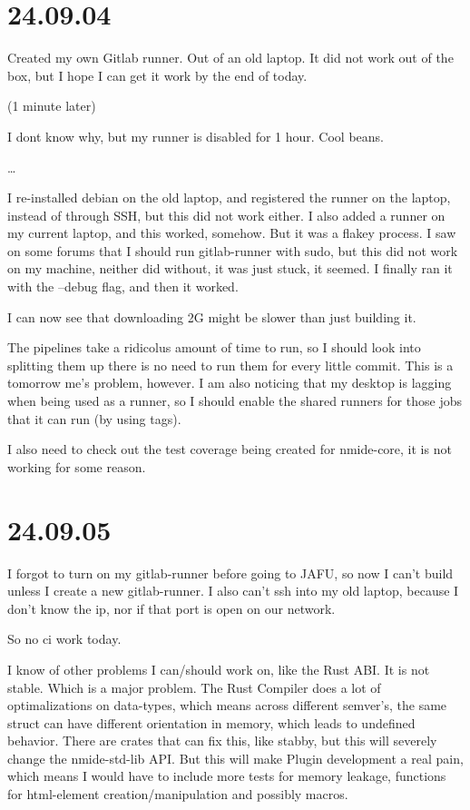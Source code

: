 \section{24.09.04}

Created my own Gitlab runner. Out of an old laptop. It did not work out of the
box, but I hope I can get it work by the end of today.

(1 minute later)

I dont know why, but my runner is disabled for 1 hour. Cool beans.

\dots

I re-installed debian on the old laptop, and registered the runner on the
laptop, instead of through SSH, but this did not work either. I also added a
runner on my current laptop, and this worked, somehow. But it was a flakey
process. I saw on some forums that I should run gitlab-runner with sudo, but
this did not work on my machine, neither did without, it was just stuck, it
seemed. I finally ran it with the --debug flag, and then it worked.

I can now see that downloading 2G might be slower than just building it.

The pipelines take a ridicolus amount of time to run, so I should look into
splitting them up there is no need to run them for every little commit. This is
a tomorrow me's problem, however. I am also noticing that my desktop is lagging
when being used as a runner, so I should enable the shared runners for those
jobs that it can run (by using tags).

I also need to check out the test coverage being created for nmide-core, it is
not working for some reason.


\section{24.09.05}

I forgot to turn on my gitlab-runner before going to JAFU, so now I can't build
unless I create a new gitlab-runner. I also can't ssh into my old laptop,
because I don't know the ip, nor if that port is open on our network.

So no ci work today.

I know of other problems I can/should work on, like the Rust ABI. It is not
stable. Which is a major problem. The Rust Compiler does a lot of
optimalizations on data-types, which means across different semver's, the same
struct can have different orientation in memory, which leads to undefined
behavior. There are crates that can fix this, like stabby, but this will
severely change the nmide-std-lib API. But this will make Plugin development a
real pain, which means I would have to include more tests for memory leakage,
functions for html-element creation/manipulation and possibly macros.

